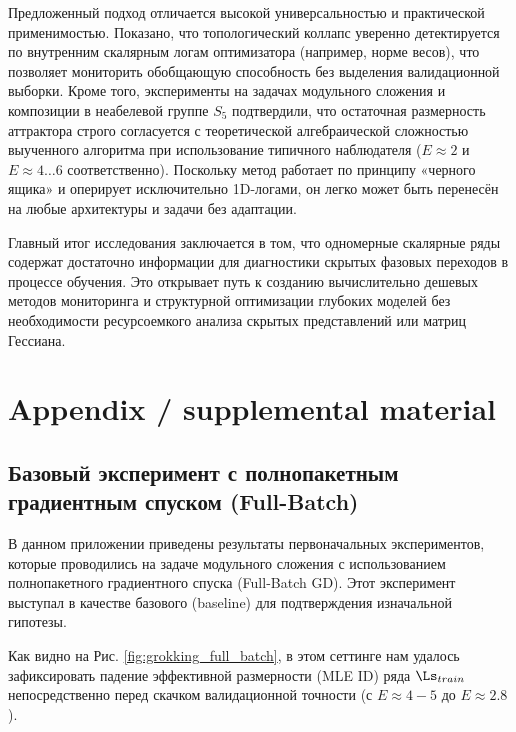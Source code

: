 \documentclass{article}
\begin{document}
Предложенный подход отличается высокой универсальностью и практической применимостью. Показано, что топологический коллапс уверенно детектируется по внутренним скалярным логам оптимизатора (например, норме весов), что позволяет мониторить обобщающую способность без выделения валидационной выборки. Кроме того, эксперименты на задачах модульного сложения и композиции в неабелевой группе $S_5$ подтвердили, что остаточная размерность аттрактора строго согласуется с теоретической алгебраической сложностью выученного алгоритма при использование типичного наблюдателя ($E \approx 2$ и $E \approx 4\dots 6$ соответственно). Поскольку метод работает по принципу «черного ящика» и оперирует исключительно 1D-логами, он легко может быть перенесён на любые архитектуры и задачи без адаптации.

Главный итог исследования заключается в том, что одномерные скалярные ряды содержат достаточно информации для диагностики скрытых фазовых переходов в процессе обучения. Это открывает путь к созданию вычислительно дешевых методов мониторинга и структурной оптимизации глубоких моделей без необходимости ресурсоемкого анализа скрытых представлений или матриц Гессиана.







\section{Appendix / supplemental material}\label{app}

\subsection{Базовый эксперимент с полнопакетным градиентным спуском (Full-Batch)}\label{app:exp}

В данном приложении приведены результаты первоначальных экспериментов, которые проводились на задаче модульного сложения с использованием полнопакетного градиентного спуска (Full-Batch GD). Этот эксперимент выступал в качестве базового (baseline) для подтверждения изначальной гипотезы.

Как видно на Рис. \ref{fig:grokking_full_batch}, в этом сеттинге нам удалось зафиксировать падение эффективной размерности (MLE ID) ряда $\Ls_{train}$ непосредственно перед скачком валидационной точности (с $E \approx 4-5$ до $E \approx 2.8$). 
\end{document}
